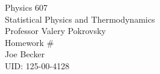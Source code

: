 \begin{titlepage}
\setlength{\topmargin}{1.5in}
\begin{center}
\Huge{Physics 607} \\
\LARGE{Statistical Physics and Thermodynamics} \\
\Large{Professor Valery Pokrovsky} \\[1cm]

\huge{Homework \#\HWnum}\\[0.5cm]

\large{Joe Becker} \\
\large{UID: 125-00-4128} \\
\large{\due} 

\end{center}

\end{titlepage}

